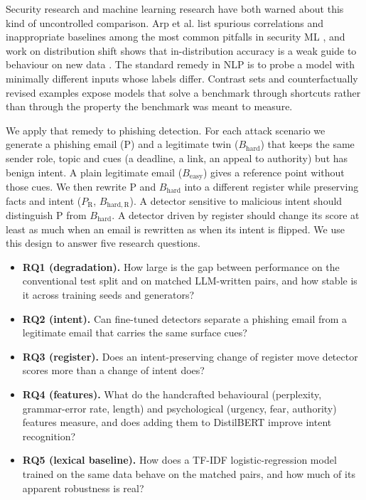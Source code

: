 \documentclass[11pt,letterpaper]{article}
\begin{document}
Security research and machine learning research have both warned about this kind of uncontrolled comparison. Arp et al. list spurious correlations and inappropriate baselines among the most common pitfalls in security ML \cite{arp2022}, and work on distribution shift shows that in-distribution accuracy is a weak guide to behaviour on new data \cite{koh2021}. The standard remedy in NLP is to probe a model with minimally different inputs whose labels differ. Contrast sets \cite{gardner2020} and counterfactually revised examples \cite{kaushik2020} expose models that solve a benchmark through shortcuts \cite{geirhos2020} rather than through the property the benchmark was meant to measure.

We apply that remedy to phishing detection. For each attack scenario we generate a phishing email (P) and a legitimate twin ($B_{\mathrm{hard}}$) that keeps the same sender role, topic and cues (a deadline, a link, an appeal to authority) but has benign intent. A plain legitimate email ($B_{\mathrm{easy}}$) gives a reference point without those cues. We then rewrite P and $B_{\mathrm{hard}}$ into a different register \cite{biber1988variation} while preserving facts and intent ($P_{\mathrm{R}}$, $B_{\mathrm{hard,R}}$). A detector sensitive to malicious intent should distinguish P from $B_{\mathrm{hard}}$. A detector driven by register should change its score at least as much when an email is rewritten as when its intent is flipped. We use this design to answer five research questions.

\begin{itemize}
\item \textbf{RQ1 (degradation).} How large is the gap between performance on the conventional test split and on matched LLM-written pairs, and how stable is it across training seeds and generators?
\item \textbf{RQ2 (intent).} Can fine-tuned detectors separate a phishing email from a legitimate email that carries the same surface cues?
\item \textbf{RQ3 (register).} Does an intent-preserving change of register move detector scores more than a change of intent does?
\item \textbf{RQ4 (features).} What do the handcrafted behavioural (perplexity, grammar-error rate, length) and psychological (urgency, fear, authority) features measure, and does adding them to DistilBERT improve intent recognition?
\item \textbf{RQ5 (lexical baseline).} How does a TF-IDF logistic-regression model trained on the same data behave on the matched pairs, and how much of its apparent robustness is real?
\end{itemize}
\end{document}
